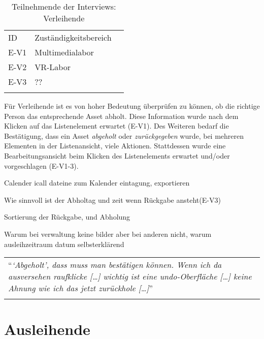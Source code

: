 \begin{table}[h]
  \centering
  \caption{Teilnehmende der Interviews: Verleihende}
  \begin{tabular}{lll}
    \arrayrulecolor{maincolor}\hline
    \sffamily\color{maincolor}ID &
    \sffamily\color{maincolor}Zuständigkeitsbereich \\
    \arrayrulecolor{maincolor}\hline
    E-V1                         & Multimedialabor  \\
    E-V2                         & VR-Labor         \\
    E-V3                         & ??               \\
    \arrayrulecolor{maincolor}\hline
  \end{tabular}
  \label{table:vzwei}
\end{table}

Für Verleihende ist es von hoher Bedeutung überprüfen zu können, ob die richtige
Person das entsprechende Asset abholt. Diese Information wurde nach dem Klicken auf das
Listenelement erwartet (E-V1). Des Weiteren bedarf die Bestätigung, dass ein
Asset \textit{abgeholt} oder \textit{zurückgegeben} wurde, bei mehreren
Elementen in der Listenansicht, viele Aktionen. Stattdessen wurde eine
Bearbeitungsansicht beim Klicken des Listenelements erwartet und/oder vorgeschlagen
(E-V1-3).


Calender icall dateine zum Kalender eintagung, exportieren

Wie sinnvoll ist der Abholtag und zeit wenn Rückgabe ansteht(E-V3)


Sortierung der Rückgabe, und Abholung


Warum bei verwaltung keine bilder aber bei anderen nicht, warum ausleihzeitraum  datum selbsterklärend

\begin{longtable}{p{}} \arrayrulecolor{maincolor}\hline
  \enquote{\textit{\enquote{Abgeholt}, dass muss man bestätigen können. Wenn ich
  da ausversehen raufklicke [\dots] wichtig ist eine undo-Oberfläche [\dots]
  keine Ahnung wie ich das jetzt zurückhole [\dots]}} \\
  \arrayrulecolor{maincolor}\hline
\end{longtable}

\section{Ausleihende}

